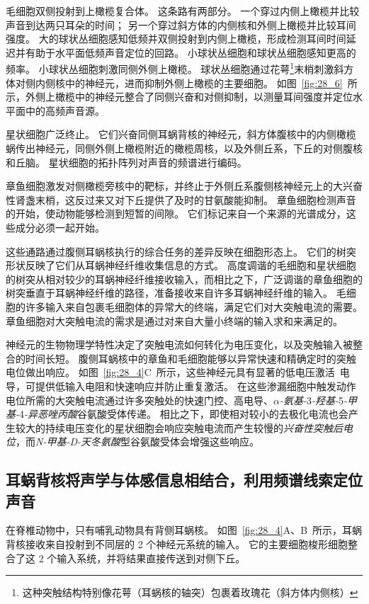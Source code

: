 毛细胞双侧投射到上橄榄复合体。
这条路有两部分。
一个穿过内侧上橄榄并比较声音到达两只耳朵的时间； 另一个穿过斜方体的内侧核和外侧上橄榄并比较耳间强度。
大的球状丛细胞感知低频并双侧投射到内侧上橄榄，形成检测耳间时间延迟并有助于水平面低频声音定位的回路。
小球状丛细胞和球状丛细胞感知更高的频率。
小球状丛细胞刺激同侧外侧上橄榄。
球状丛细胞通过花萼\footnote{这种突触结构特别像花萼（耳蜗核的轴突）包裹着玫瑰花（斜方体内侧核）}末梢刺激斜方体对侧内侧核中的神经元，进而抑制外侧上橄榄的主要细胞。
如图~\ref{fig:28_6}~所示，外侧上橄榄中的神经元整合了同侧兴奋和对侧抑制，以测量耳间强度并定位水平面中的高频声音源。


星状细胞广泛终止。
它们兴奋同侧耳蜗背核的神经元，斜方体腹核中的内侧橄榄蜗传出神经元，同侧外侧上橄榄附近的橄榄周核，以及外侧丘系，下丘的对侧腹核和丘脑。 
星状细胞的拓扑阵列对声音的频谱进行编码。


章鱼细胞激发对侧橄榄旁核中的靶标，并终止于外侧丘系腹侧核神经元上的大兴奋性肾盏末梢，这反过来又对下丘提供了及时的甘氨酸能抑制。
章鱼细胞检测声音的开始，使动物能够检测到短暂的间隙。
它们标记来自一个来源的光谱成分，这些成分必须一起开始。


这些通路通过腹侧耳蜗核执行的综合任务的差异反映在细胞形态上。
它们的树突形状反映了它们从耳蜗神经纤维收集信息的方式。
高度调谐的毛细胞和星状细胞的树突从相对较少的耳蜗神经纤维接收输入，而相比之下，广泛调谐的章鱼细胞的树突垂直于耳蜗神经纤维的路径，准备接收来自许多耳蜗神经纤维的输入。
毛细胞的许多输入来自包裹毛细胞体的异常大的终端，满足它们对大突触电流的需要。
章鱼细胞对大突触电流的需求是通过对来自大量小终端的输入求和来满足的。


神经元的生物物理学特性决定了突触电流如何转化为电压变化，以及突触输入被整合的时间长短。
腹侧耳蜗核中的章鱼和毛细胞能够以异常快速和精确定时的突触电位做出响应。
如图~\ref{fig:28_4}C~所示，这些神经元具有显著的低电压激活~电导，可提供低输入电阻和快速响应并防止重复激活。
在这些渗漏细胞中触发动作电位所需的大突触电流通过许多突触处的快速门控、高电导、\textit{$\alpha$-氨基-}3\textit{-羟基-}5\textit{-甲基-}4\textit{-异恶唑丙酸}谷氨酸受体传递。
相比之下，即使相对较小的去极化电流也会产生较大的持续电压变化的星状细胞会响应突触电流而产生较慢的\textit{兴奋性突触后电位}，而\textit{N-甲基-D-天冬氨酸}型谷氨酸受体会增强这些响应。



\subsection{耳蜗背核将声学与体感信息相结合，利用频谱线索定位声音}

在脊椎动物中，只有哺乳动物具有背侧耳蜗核。
如图~\ref{fig:28_4}A、B~所示，耳蜗背核接收来自投射到不同层的 2 个神经元系统的输入。
它的主要细胞梭形细胞整合了这 2 个输入系统，并将结果直接传送到对侧下丘。


